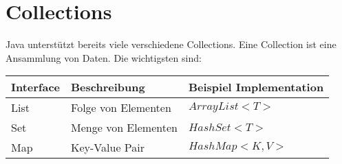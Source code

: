 \section{Collections}
Java unterstützt bereits viele verschiedene Collections. Eine Collection ist eine Ansammlung von Daten. Die wichtigsten sind:\\
\begin{tabular}{lll}
	Interface & Beschreibung & Beispiel Implementation \\ \toprule
	List & Folge von Elementen & $ArrayList<T>$ \\
	Set & Menge von Elementen & $HashSet<T>$ \\
	Map & Key-Value Pair & $HashMap<K, V>$ \\
\end{tabular}